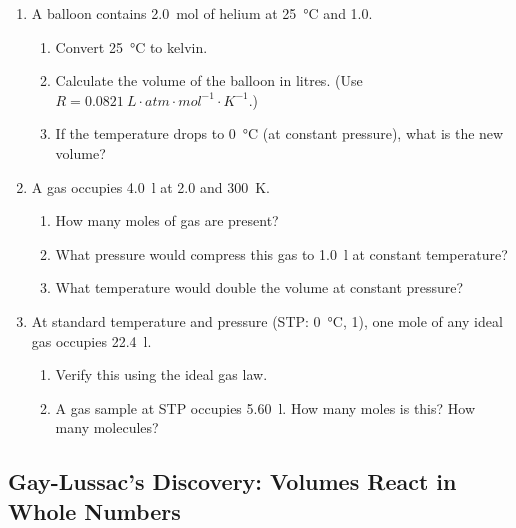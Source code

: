 \documentclass[12pt, a4paper]{book}
\theoremstyle{definition}
\begin{document}
\begin{problembox}
\begin{enumerate}[label=\textbf{\arabic*.}]
  \item A balloon contains \SI{2.0}{\mol} of helium at
        \SI{25}{\degreeCelsius} and \SI{1.0}{}.
        \begin{enumerate}[label=(\alph*)]
          \item Convert \SI{25}{\degreeCelsius} to kelvin.
          \item Calculate the volume of the balloon in litres.
                (Use $R = \SI{0.0821}{L\cdot atm\cdot mol^{-1}\cdot K^{-1}}$.)
          \item If the temperature drops to \SI{0}{\degreeCelsius}
                (at constant pressure), what is the new volume?
        \end{enumerate}

  \item A gas occupies \SI{4.0}{\litre} at \SI{2.0}{}
        and \SI{300}{\kelvin}.
        \begin{enumerate}[label=(\alph*)]
          \item How many moles of gas are present?
          \item What pressure would compress this gas
                to \SI{1.0}{\litre} at constant temperature?
          \item What temperature would double the volume
                at constant pressure?
        \end{enumerate}

  \item At standard temperature and pressure (STP:
        \SI{0}{\degreeCelsius}, \SI{1}{}),
        one mole of any ideal gas occupies \SI{22.4}{\litre}.
        \begin{enumerate}[label=(\alph*)]
          \item Verify this using the ideal gas law.
          \item A gas sample at STP occupies \SI{5.60}{\litre}.
                How many moles is this?
                How many molecules?
        \end{enumerate}
\end{enumerate}
\end{problembox}

\subsection{Gay-Lussac's Discovery: Volumes React in Whole Numbers}
\end{document}
